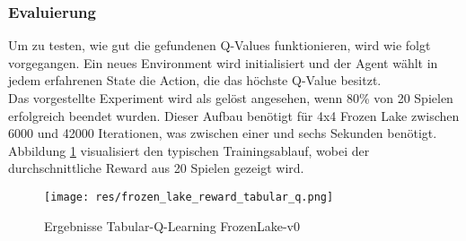 \documentclass[11pt]{scrartcl}
\begin{document}
\subsubsection{Evaluierung}
Um zu testen, wie gut die gefundenen Q-Values funktionieren, wird wie folgt vorgegangen.
Ein neues Environment wird initialisiert und der Agent wählt in jedem erfahrenen State die
Action, die das höchste Q-Value besitzt.\\
Das vorgestellte Experiment wird als gelöst angesehen, wenn 80\% von 20 Spielen erfolgreich
beendet wurden. Dieser Aufbau benötigt für 4x4 Frozen Lake zwischen 6000 und 42000
Iterationen, was zwischen einer und sechs Sekunden benötigt. Abbildung
\ref{fig:frozen-lake_q_learning} visualisiert den typischen Trainingsablauf, wobei der
durchschnittliche Reward aus 20 Spielen gezeigt wird.

\begin{figure}[htp]
\centering
\texttt{[image: res/frozen\_lake\_reward\_tabular\_q.png]}
\caption{Ergebnisse Tabular-Q-Learning FrozenLake-v0}
\label{fig:frozen-lake_q_learning}
\end{figure}
\end{document}
